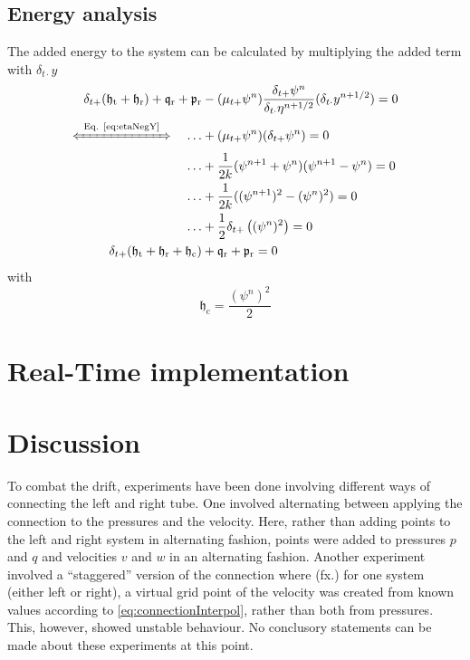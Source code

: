 \subsection{Energy analysis}
The added energy to the system can be calculated by multiplying the added term with $\delta_{t\cdot}y$
\begin{align}
    \delta_{t+}(\mathfrak{h}_\text{t}+\mathfrak{h}_\text{r}) + \q_\text{r} + \mathfrak{p}_\text{r}&-(\mu_{t+}\psi^n) \frac{\delta_{t+}\psi^n}{\delta_{t\cdot}\eta^{n+1/2}}(\delta_{t\cdot}y^{n+1/2}) = 0\nonumber\\[-5pt]
    \xLeftrightarrow{\mystrut\ \text{Eq. \eqref{eq:etaNegY}}\ }\quad \hdots &+ (\mu_{t+}\psi^n) (\delta_{t+}\psi^n) = 0\nonumber\\
    \hdots &+ \frac{1}{2k}(\psi^{n+1}+\psi^n)(\psi^{n+1} - \psi^n)=0\nonumber\\
    \hdots  &+\frac{1}{2k}((\psi^{n+1})^2 - (\psi^n)^2)=0\nonumber\\
    \hdots &+ \frac{1}{2}\delta_{t+}\left((\psi^n)^2\right) = 0\nonumber\\
    \delta_{t+}(\mathfrak{h}_\text{t}+\mathfrak{h}_\text{r} + \mathfrak{h}_\text{c}) &+ \q_\text{r} + \mathfrak{p}_\text{r} = 0
\end{align}
with
\begin{equation}
    \mathfrak{h}_\text{c} = \frac{(\psi^n)^2}{2 }\nonumber
\end{equation}
\section{Real-Time implementation}


\section{Discussion}
To combat the drift, experiments have been done involving different ways of connecting the left and right tube. One involved alternating between applying the connection to the pressures and the velocity. Here, rather than adding points to the left and right system in alternating fashion, points were added to pressures $p$ and $q$ and velocities $v$ and $w$ in an alternating fashion. Another experiment involved a ``staggered'' version of the connection where (fx.) for one system (either left or right), a virtual grid point of the velocity was created from known values according to \eqref{eq:connectionInterpol}, rather than both from pressures. This, however, showed unstable behaviour. No conclusory statements can be made about these experiments at this point. 



